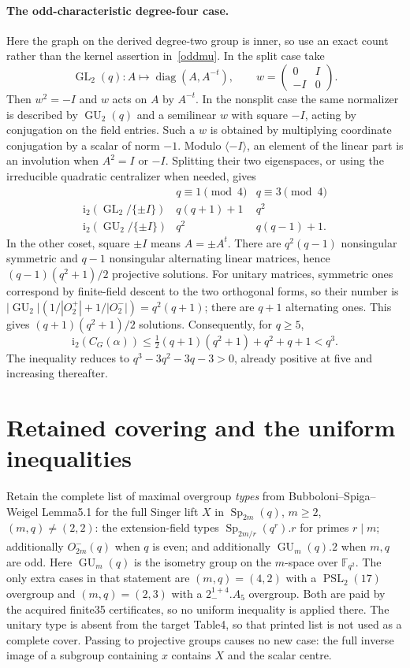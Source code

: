 \documentclass[10pt]{article}
\newcommand{\ii}{\mathrm i_2}\newcommand{\nuu}{\nu_2}\newcommand{\F}{\mathbb F}\newcommand{\GL}{\operatorname{GL}}\newcommand{\GU}{\operatorname{GU}}\newcommand{\Sp}{\operatorname{Sp}}\newcommand{\PSp}{\operatorname{PSp}}\newcommand{\PGSp}{\operatorname{PGSp}}\newcommand{\Aut}{\operatorname{Aut}}
\begin{document}
\paragraph{The odd-characteristic degree-four case.}
Here the graph on the derived degree-two group is inner, so use an exact
count rather than the kernel assertion in~\eqref{oddmu}. In the split
case take
\[
 \GL_2(q): A\mapsto\operatorname{diag}(A,A^{-t}),\qquad
 w=\begin{pmatrix}0&I\\-I&0\end{pmatrix}.
\]
Then $w^2=-I$ and $w$ acts on $A$ by $A^{-t}$. In the nonsplit case the
same normalizer is described by $\GU_2(q)$ and a semilinear $w$ with square
$-I$, acting by conjugation on the field entries. Such a $w$ is obtained
by multiplying coordinate conjugation by a scalar of norm $-1$.
Modulo $\langle-I\rangle$, an element of the linear part is an involution
when $A^2=I$ or $-I$. Splitting their two eigenspaces, or using the
irreducible quadratic centralizer when needed, gives
\[
\begin{array}{c|cc}
& q\equiv1\pmod4&q\equiv3\pmod4\\\hline
\ii(\GL_2/\{\pm I\})&q(q+1)+1&q^2\\
\ii(\GU_2/\{\pm I\})&q^2&q(q-1)+1.
\end{array}
\]
In the other coset, square $\pm I$ means $A=\pm A^t$.
There are $q^2(q-1)$ nonsingular symmetric and $q-1$ nonsingular alternating
linear matrices, hence $(q-1)(q^2+1)/2$ projective solutions. For unitary
matrices, symmetric ones correspond by finite-field descent to the two
orthogonal forms, so their number is
$|\GU_2|(1/|O_2^+|+1/|O_2^-|)=q^2(q+1)$; there are $q+1$ alternating
ones. This gives $(q+1)(q^2+1)/2$ solutions. Consequently, for $q\ge5$,
\begin{equation}\label{mu4odd}
 \ii(C_G(\alpha))\le\tfrac12(q+1)(q^2+1)+q^2+q+1<q^3.
\end{equation}
The inequality reduces to $q^3-3q^2-3q-3>0$, already positive at five
and increasing thereafter.

\section{Retained covering and the uniform inequalities}
Retain the complete list of maximal overgroup \emph{types} from
Bubboloni--Spiga--Weigel Lemma5.1 for the full Singer lift $X$ in
$\Sp_{2m}(q)$, $m\ge2$, $(m,q)\ne(2,2)$: the extension-field types
$\Sp_{2m/r}(q^r).r$ for primes $r\mid m$; additionally $O^-_{2m}(q)$
when $q$ is even; and additionally $\GU_m(q).2$ when $m,q$ are odd.
Here $\GU_m(q)$ is the isometry group on the $m$-space over $\F_{q^2}$.
The only extra cases in that statement are $(m,q)=(4,2)$ with a
$\operatorname{PSL}_2(17)$ overgroup and $(m,q)=(2,3)$ with a
$2_-^{1+4}.A_5$ overgroup. Both are paid by the acquired finite35
certificates, so no uniform inequality is applied there.
The unitary type is absent from
the target Table4, so that printed list is not used as a complete cover.
Passing to projective groups causes no new case: the full inverse image
of a subgroup containing $x$ contains $X$ and the scalar centre.
\end{document}

